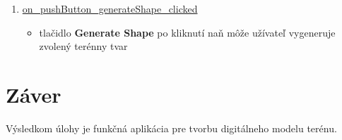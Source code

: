 \documentclass[12pt]{article}
\begin{document}
\begin{enumerate}
\item[] \underline{on\_pushButton\_generateShape\_clicked}
\begin{itemize}
\item tlačidlo \textbf{Generate Shape} po kliknutí naň môže užívateľ vygeneruje zvolený terénny tvar
\end{itemize}



\end{enumerate}


\clearpage
\section{Záver}
Výsledkom úlohy je funkčná aplikácia pre tvorbu digitálneho modelu terénu.


\newpage

\listoffigures





\nocite{*}
{}


   
\end{document}

